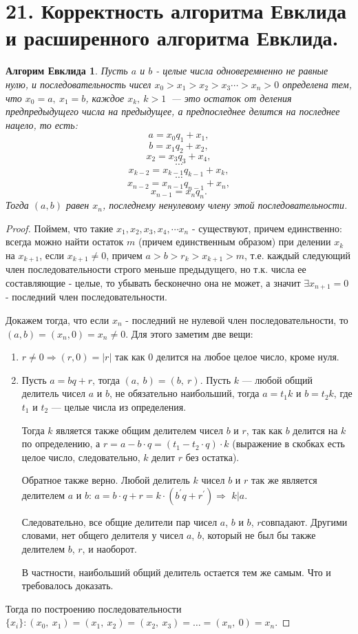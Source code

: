\documentclass[a4paper,12pt]{article}
\newtheorem*{Evc} {Алгорим Евклида}
\newcommand{\p}{^{\prime}}
\begin{document}
		\section*{21. Корректность алгоритма Евклида и расширенного алгоритма Евклида.}
		\begin{Evc}
		Пусть $a$ и $b$ - целые числа одноверемненно не равные нулю, и последовательность чисел
		$ x_0 > x_1 > x_2 > x_3 \cdots > x_n > 0$
		определена тем, что $x_0 = a,\ x_1 = b$, каждое $x_k,\ k > 1$ — это остаток от деления предпредыдущего числа на предыдущее, а предпоследнее делится на последнее нацело, то есть:
		$$a = x_0q_1 + x_1,$$
		$$b = x_1q_2 + x_2,$$
		$$x_2 = x_3q_3 + x_4,$$
		$$\cdots$$
		$$x_{k-2} = x_{k-1} q_{k-1} + x_k,$$	 
		$$\cdots$$
		$$x_{n-2} = x_{n-1}q_{n-1}+ x_n,$$
		$$x_{n-1} = x_n q_n.$$
		Тогда $(a, b)$ равен $x_n$, последнему ненулевому члену этой последовательности.
		\end{Evc}
		\begin{proof}
			Поймем, что такие $x_1, x_2, x_3, x_4, \cdots x_n$ - существуют, причем единственно: всегда можно найти остаток $m$ (причем единственным образом) при делении $x_k$ на $x_{k + 1}$, если $x_{k + 1} \ne 0$, причем $a > b > r_k > x_{k + 1} > m$, т.е. каждый следующий член последовательности строго меньше предыдущего, но т.к. числа ее составляющие - целые, то убывать бесконечно она не может, а значит $\exists x_{n + 1} = 0$ - последний член последовательности.

			Докажем тогда, что если $x_n$ - последний не нулевой член последовательности, то $(a, b) = (x_n, 0) = x_n \ne 0$. Для этого заметим две вещи:
			\begin{enumerate}
				\item $r \ne 0 \Rightarrow (r, 0) = |r|$ так как 0 делится на любое целое число, кроме нуля.

				\item Пусть $a = bq + r$, тогда $(a,\ b) = (b,\ r)$.
				Пусть $k$ — любой общий делитель чисел $a$ и $b$, не обязательно наибольший, тогда $a = t_1k$ и $b = t_2k$, где $t_1$ и $t_2$ — целые числа из определения.

				Тогда $k$ является также общим делителем чисел $b$ и $r$, так как $b$ делится на $k$ по определению, а $r = a - b\cdot q = (t_1 - t_2\cdot q)\cdot k$ (выражение в скобках есть целое число, следовательно, $k$ делит $r$ без остатка). 
				
				Обратное также верно. Любой делитель $k$ чисел $b$ и $r$ так же является делителем $a$ и $b$: $a = b \cdot q + r = k\cdot (b\p q + r\p)$$\Rightarrow$ $k|a$.
				
				Следовательно, все общие делители пар чисел $a$, $b$ и $b$, $r$совпадают. Другими словами, нет общего делителя у чисел $a$, $b$, который не был бы также делителем $b$, $r$, и наоборот.
				
				В частности, наибольший общий делитель остается тем же самым. Что и требовалось доказать.
			\end{enumerate}

			Тогда по построению последовательности $\{x_i\}: (x_0,\ x_1) = (x_1,\ x_2) = (x_2,\ x_3) = \ldots = (x_n,\ 0) = x_n$.
		\end{proof}
\end{document}
